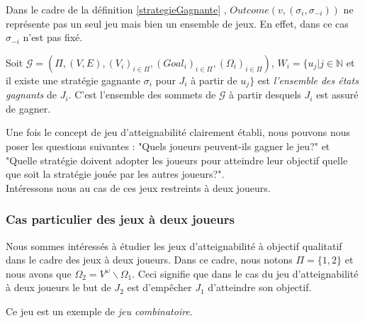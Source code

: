 	\begin{rem}
		Dans le cadre de la définition \ref{strategieGagnante} , $Outcome(v,(\sigma _{i}, \sigma _{-i}))$ ne représente pas un seul jeu mais bien un ensemble de jeux. En effet, dans ce cas $\sigma _{-i}$ n'est pas fixé.
	\end{rem}
		
	
	\begin{defi}
		Soit $\mathcal{G} = (\Pi,(V,E),(V_{i})_{i \in \Pi}, (Goal_{i})_{i \in \Pi},(\Omega _{i})_{i \in \Pi})$, $W_{i} = \{ u_{j} |j\in \mathbb{N}$ et il existe une stratégie gagnante $\sigma _{i}$ pour $J_{i}$ à partir de $u_{j}\}$ est \textit{l'ensemble des états gagnants} de $J_{i}$. C'est l'ensemble des sommets de $\mathcal{G}$ à partir desquels $J_{i}$ est assuré de gagner.
	\end{defi}
	
	
	
	Une fois le concept de jeu d'atteignabilité clairement établi, nous pouvons nous poser les questions suivantes : "Quels joueurs peuvent-ils gagner le jeu?" et "Quelle stratégie doivent adopter les joueurs pour atteindre leur objectif quelle que soit la stratégie jouée par les autres joueurs?". \\
	
	Intéressons nous au cas de ces jeux restreints à deux joueurs.
	
	\subsubsection{Cas particulier des jeux à deux joueurs}
	Nous sommes intéressés à étudier les jeux d'atteignabilité à objectif qualitatif dans le cadre des jeux à deux joueurs. Dans ce cadre, nous notons $\Pi = \{1,2\}$ et nous avons que $\Omega _{2} = V^{\omega}\backslash \Omega _{1}$. Ceci signifie que dans le cas du jeu d'atteignabilité à deux joueurs le but de $J_{2}$ est d'empêcher $J_{1}$ d'atteindre son objectif.
	\begin{rem}
		Ce jeu est un exemple de \textit{jeu combinatoire}.
	\end{rem}
	
